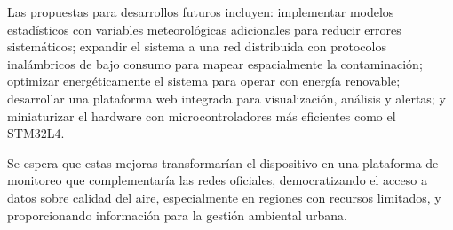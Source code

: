 Las propuestas para desarrollos futuros incluyen: implementar modelos estadísticos con variables meteorológicas adicionales para reducir errores sistemáticos; expandir el sistema a una red distribuida con protocolos inalámbricos de bajo consumo para mapear espacialmente la contaminación; optimizar energéticamente el sistema para operar con energía renovable; desarrollar una plataforma web integrada para visualización, análisis y alertas; y miniaturizar el hardware con microcontroladores más eficientes como el STM32L4. 

Se espera que estas mejoras transformarían el dispositivo en una plataforma de monitoreo que complementaría las redes oficiales, democratizando el acceso a datos sobre calidad del aire, especialmente en regiones con recursos limitados, y proporcionando información para la gestión ambiental urbana.